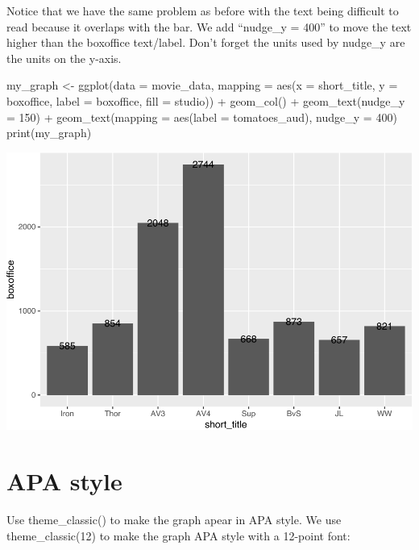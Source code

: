 \documentclass[
]{krantz}
\makeatletter
\newenvironment{Shaded}{\begin{snugshade}}{\end{snugshade}}
\newcommand{\AttributeTok}[1]{\textcolor[rgb]{0.61,0.61,0.61}{#1}}
\newcommand{\DecValTok}[1]{\textcolor[rgb]{0.06,0.06,0.06}{#1}}
\newcommand{\FunctionTok}[1]{\textcolor[rgb]{0,0,0}{#1}}
\newcommand{\NormalTok}[1]{#1}
\newcommand{\OtherTok}[1]{\textcolor[rgb]{0.37,0.37,0.37}{#1}}
\newcommand{\SpecialCharTok}[1]{\textcolor[rgb]{0,0,0}{#1}}
\newenvironment{kframe}{%
\medskip{}
\setlength{\fboxsep}{.8em}
 \def\at@end@of@kframe{}%
 \ifinner\ifhmode%
  \def\at@end@of@kframe{\end{minipage}}%
  \begin{minipage}{\columnwidth}%
 \fi\fi%
 \def\FrameCommand##1{\hskip\@totalleftmargin \hskip-\fboxsep
 \colorbox{shadecolor}{##1}\hskip-\fboxsep
     \hskip-\linewidth \hskip-\@totalleftmargin \hskip\columnwidth}%
 \MakeFramed {\advance\hsize-\width
   \@totalleftmargin\z@ \linewidth\hsize
   \@setminipage}}%
 {\par\unskip\endMakeFramed%
 \at@end@of@kframe}
\renewenvironment{Shaded}{\begin{kframe}}{\end{kframe}}
\makeatother
\begin{document}
Notice that we have the same problem as before with the text being difficult to read because it overlaps with the bar. We add ``nudge\_y = 400'' to move the text higher than the boxoffice text/label. Don't forget the units used by nudge\_y are the units on the y-axis.

\begin{Shaded}
\begin{Highlighting}[]
\NormalTok{my\_graph }\OtherTok{\textless{}{-}} \FunctionTok{ggplot}\NormalTok{(}\AttributeTok{data =}\NormalTok{ movie\_data,}
           \AttributeTok{mapping =} \FunctionTok{aes}\NormalTok{(}\AttributeTok{x =}\NormalTok{ short\_title,}
                         \AttributeTok{y =}\NormalTok{ boxoffice,}
                         \AttributeTok{label =}\NormalTok{ boxoffice, }
                         \AttributeTok{fill =}\NormalTok{ studio)) }\SpecialCharTok{+}
  \FunctionTok{geom\_col}\NormalTok{() }\SpecialCharTok{+}
  \FunctionTok{geom\_text}\NormalTok{(}\AttributeTok{nudge\_y =} \DecValTok{150}\NormalTok{)  }\SpecialCharTok{+}
  \FunctionTok{geom\_text}\NormalTok{(}\AttributeTok{mapping =} \FunctionTok{aes}\NormalTok{(}\AttributeTok{label =}\NormalTok{ tomatoes\_aud), }
            \AttributeTok{nudge\_y =} \DecValTok{400}\NormalTok{) }
\FunctionTok{print}\NormalTok{(my\_graph)}
\end{Highlighting}
\end{Shaded}

\includegraphics[width=0.65\linewidth]{bookdown_files/figure-latex/unnamed-chunk-107-1}

\newpage

\hypertarget{apa-style}{%
\section{APA style}\label{apa-style}}

Use theme\_classic() to make the graph apear in APA style. We use theme\_classic(12) to make the graph APA style with a 12-point font:
\end{document}
